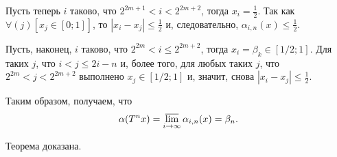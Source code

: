 Пусть теперь $i$ таково, что $2^{2m+1}<i<2^{2m+2}$,
тогда $x_i = \frac{1}{2}$.
Так как
$\forall(j)\left[x_j\in[0;1]\right]$,
то
$|x_i - x_j| \leq \frac{1}{2}$
и, следовательно,
$\alpha_{i,n}(x)  \leq \frac{1}{2}$.

Пусть, наконец, $i$ таково, что $2^{2m}<i \leq 2^{2m+2}$,
тогда
$x_i = \beta_k \in [1/2;1]$.
Для таких $j$, что $i<j\leq 2i-n$ и, более того,
для любых таких $j$, что $2^{2m}<j<2^{2m+2}$
выполнено $x_j\in[1/2; 1]$
и, значит, снова $|x_i - x_j| \leq \frac{1}{2}$.

Таким образом, получаем, что
\begin{equation}
	\alpha(T^n x) = \varlimsup_{i \to \infty} \alpha_{i,n}(x) = \beta_n
	.
\end{equation}

Теорема доказана.
